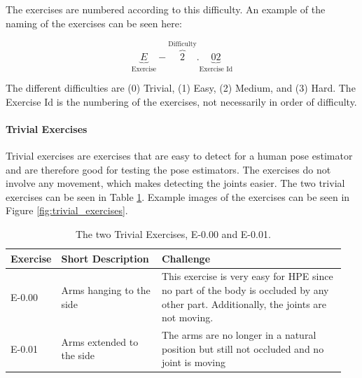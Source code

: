 The exercises are numbered according to this difficulty. An example of the naming of the exercises can be seen here:

\[
    \underbrace{E}_\text{Exercise}-\overbrace{2}^\text{Difficulty}.\underbrace{02}_\text{Exercise Id}
\]

The different difficulties are (0) Trivial, (1) Easy, (2) Medium, and (3) Hard. The Exercise Id is the numbering of the exercises, not necessarily in order of difficulty.

\paragraph{Trivial Exercises}

Trivial exercises are exercises that are easy to detect for a human pose estimator and are therefore good for testing the pose estimators. The exercises do not involve any movement, which makes detecting the joints easier. The two trivial exercises can be seen in Table \ref{tab:trivial_exercises}. Example images of the exercises can be seen in Figure \ref{fig:trivial_exercises}.

\begin{table}[htb]
  \caption[Trivial Exercises]{The two Trivial Exercises, E-0.00 and E-0.01.}
  \label{tab:trivial_exercises}
  \begin{tabular}{p{0.1\linewidth}p{0.3\linewidth}p{0.55\linewidth}}
  \hline
  \textbf{Exercise} & \textbf{Short Description}         & \textbf{Challenge}   \\ \hline
  E-0.00   & Arms hanging to the side  & This exercise is very easy for HPE since no part of the body is occluded by any other part. Additionally, the joints are not moving. \\
  E-0.01   & Arms extended to the side & The arms are no longer in a natural position but still not occluded and no joint is moving \\ \hline
  \end{tabular}
\end{table} 


